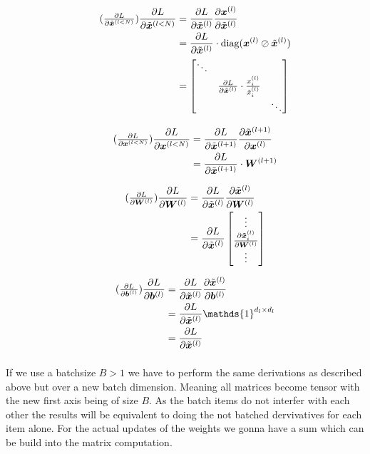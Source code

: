 \documentclass{article}
\newcommand\bM[1]{\ensuremath{\begin{bmatrix}#1\end{bmatrix}}}
\newcommand\·{\ensuremath{\cdot}}
\newcommand\…{\ensuremath{\dots}}
\renewcommand\t{\ensuremath{\times}}
\DeclareMathOperator{\diag}{diag}
\newcommand{\⇔}{\ensuremath{\iff}}
\newcommand{\⇐}{\ensuremath{\impliedby}}
\newcommand{\⇒}{\ensuremath{\implies}}
\newcommand\f[2]{\ensuremath{\frac{#1}{#2}}}
\newcommand\pf[2]{\ensuremath{\frac{\partial {#1}}{\partial {#2}}}}
\newcommand*{\B}[1]{\ifmmode\bm{#1}\else\textbf{#1}\fi}
\newcommand\1{\ensuremath{\mathds{1}}}
\newcommand\ℝ{\ensuremath{\mathds{R}}}
\begin{document}
\begin{align*}
  \tag{$\pf{L}{\tilde{\B{x}}^{(l<N)}}$}
  \pf{L}{\tilde{\B{x}}^{(l<N)}}
  &= \pf{L}{\tilde{\B{x}}^{(l)}}\pf{\B{x}^{(l)}}{\tilde{\B{x}}^{(l)}}\\
  &= \pf{L}{\tilde{\B{x}}^{(l)}}\·\diag(\B{x}^{(l)}\oslash\tilde{\B{x}}^{(l)})\\
  &= \bM{\ddots & &\\ & \pf{L}{\tilde{\B{x}}^{(l)}}\·\f{x^{(l)}_i}{\tilde{x}^{(l)}_i} &\\ & &\ddots}
\end{align*}

\begin{align*}
  \tag{$\pf{L}{\B{x}^{(l<N)}}$}
  \pf{L}{\B{x}^{(l<N)}}
  &= \pf{L}{\tilde{\B{x}}^{(l+1)}}\pf{\tilde{\B{x}}^{(l+1)}}{\B{x}^{(l)}}\\
  &= \pf{L}{\tilde{\B{x}}^{(l+1)}}\·\B{W}^{(l+1)}\\
\end{align*}

\begin{align*}
  \tag{$\pf{L}{\B{W}^{(l)}}$}
  \pf{L}{\B{W}^{(l)}}
  &= \pf{L}{\tilde{\B{x}}^{(l)}} \pf{\tilde{\B{x}}^{(l)}}{\B{W}^{(l)}}\\
  &= \pf{L}{\tilde{\B{x}}^{(l)}} \bM{\vdots\\\pf{\tilde{\B{x}}^{(l)}_i}{\B{W}^{(l)}}\\\vdots}
\end{align*}

\begin{align*}
  \tag{$\pf{L}{\B{b}^{(l)}}$}
  \pf{L}{\B{b}^{(l)}}
  &= \pf{L}{\tilde{\B{x}}^{(l)}}\pf{\tilde{\B{x}}^{(l)}}{\B{b}^{(l)}}\\
  &= \pf{L}{\tilde{\B{x}}^{(l)}}\1^{d_l\t d_l}\\
  &= \pf{L}{\tilde{\B{x}}^{(l)}}
\end{align*}

\subsubsection{}
If we use a batchsize $B>1$ we have to perform the same derivations as described above but over a new batch dimension.
Meaning all matrices become tensor with the new first axis being of size $B$.
As the batch items do not interfer with each other the results will be equivalent to doing the not batched dervivatives for each item alone.
For the actual updates of the weights we gonna have a sum which can be build into the matrix computation.
\end{document}
